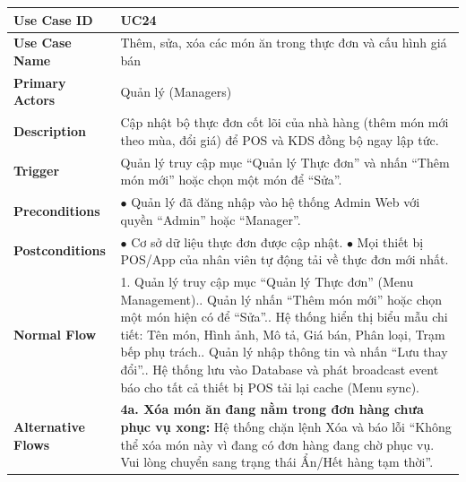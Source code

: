 \begin{longtable}{|L{3.5cm}|L{12.5cm}|}
\hline
\textbf{Use Case ID} & UC24 \\ \hline
\textbf{Use Case Name} & Thêm, sửa, xóa các món ăn trong thực đơn và cấu hình giá bán \\ \hline
\textbf{Primary Actors} & Quản lý (Managers) \\ \hline
\textbf{Description} & Cập nhật bộ thực đơn cốt lõi của nhà hàng (thêm món mới theo mùa, đổi giá) để POS và KDS đồng bộ ngay lập tức. \\ \hline
\textbf{Trigger} & Quản lý truy cập mục ``Quản lý Thực đơn'' và nhấn ``Thêm món mới'' hoặc chọn một món để ``Sửa''. \\ \hline
\textbf{Preconditions} & $\bullet$ Quản lý đã đăng nhập vào hệ thống Admin Web với quyền ``Admin'' hoặc ``Manager''. \\ \hline
\textbf{Postconditions} &
$\bullet$ Cơ sở dữ liệu thực đơn được cập nhật.\newline
$\bullet$ Mọi thiết bị POS/App của nhân viên tự động tải về thực đơn mới nhất. \\ \hline
\textbf{Normal Flow} &
1. Quản lý truy cập mục ``Quản lý Thực đơn'' (Menu Management).. Quản lý nhấn ``Thêm món mới'' hoặc chọn một món hiện có để ``Sửa''.. Hệ thống hiển thị biểu mẫu chi tiết: Tên món, Hình ảnh, Mô tả, Giá bán, Phân loại, Trạm bếp phụ trách.. Quản lý nhập thông tin và nhấn ``Lưu thay đổi''.. Hệ thống lưu vào Database và phát broadcast event báo cho tất cả thiết bị POS tải lại cache (Menu sync). \\ \hline
\textbf{Alternative Flows} &
\textbf{4a. Xóa món ăn đang nằm trong đơn hàng chưa phục vụ xong:} Hệ thống chặn lệnh Xóa và báo lỗi ``Không thể xóa món này vì đang có đơn hàng đang chờ phục vụ. Vui lòng chuyển sang trạng thái Ẩn/Hết hàng tạm thời''. \\ \hline
\end{longtable}

